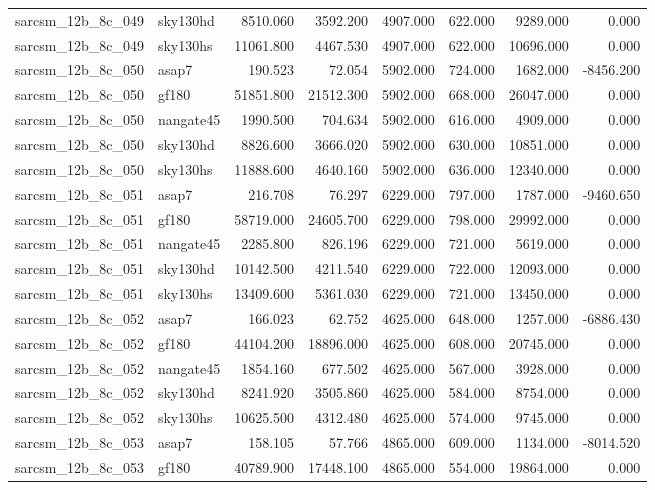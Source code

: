 \begin{tabular}{llrrrrrr}
sarcsm\_12b\_8c\_049 & sky130hd & 8510.060 & 3592.200 & 4907.000 & 622.000 & 9289.000 & 0.000 \\
sarcsm\_12b\_8c\_049 & sky130hs & 11061.800 & 4467.530 & 4907.000 & 622.000 & 10696.000 & 0.000 \\
sarcsm\_12b\_8c\_050 & asap7 & 190.523 & 72.054 & 5902.000 & 724.000 & 1682.000 & -8456.200 \\
sarcsm\_12b\_8c\_050 & gf180 & 51851.800 & 21512.300 & 5902.000 & 668.000 & 26047.000 & 0.000 \\
sarcsm\_12b\_8c\_050 & nangate45 & 1990.500 & 704.634 & 5902.000 & 616.000 & 4909.000 & 0.000 \\
sarcsm\_12b\_8c\_050 & sky130hd & 8826.600 & 3666.020 & 5902.000 & 630.000 & 10851.000 & 0.000 \\
sarcsm\_12b\_8c\_050 & sky130hs & 11888.600 & 4640.160 & 5902.000 & 636.000 & 12340.000 & 0.000 \\
sarcsm\_12b\_8c\_051 & asap7 & 216.708 & 76.297 & 6229.000 & 797.000 & 1787.000 & -9460.650 \\
sarcsm\_12b\_8c\_051 & gf180 & 58719.000 & 24605.700 & 6229.000 & 798.000 & 29992.000 & 0.000 \\
sarcsm\_12b\_8c\_051 & nangate45 & 2285.800 & 826.196 & 6229.000 & 721.000 & 5619.000 & 0.000 \\
sarcsm\_12b\_8c\_051 & sky130hd & 10142.500 & 4211.540 & 6229.000 & 722.000 & 12093.000 & 0.000 \\
sarcsm\_12b\_8c\_051 & sky130hs & 13409.600 & 5361.030 & 6229.000 & 721.000 & 13450.000 & 0.000 \\
sarcsm\_12b\_8c\_052 & asap7 & 166.023 & 62.752 & 4625.000 & 648.000 & 1257.000 & -6886.430 \\
sarcsm\_12b\_8c\_052 & gf180 & 44104.200 & 18896.000 & 4625.000 & 608.000 & 20745.000 & 0.000 \\
sarcsm\_12b\_8c\_052 & nangate45 & 1854.160 & 677.502 & 4625.000 & 567.000 & 3928.000 & 0.000 \\
sarcsm\_12b\_8c\_052 & sky130hd & 8241.920 & 3505.860 & 4625.000 & 584.000 & 8754.000 & 0.000 \\
sarcsm\_12b\_8c\_052 & sky130hs & 10625.500 & 4312.480 & 4625.000 & 574.000 & 9745.000 & 0.000 \\
sarcsm\_12b\_8c\_053 & asap7 & 158.105 & 57.766 & 4865.000 & 609.000 & 1134.000 & -8014.520 \\
sarcsm\_12b\_8c\_053 & gf180 & 40789.900 & 17448.100 & 4865.000 & 554.000 & 19864.000 & 0.000 \\

\end{tabular}
